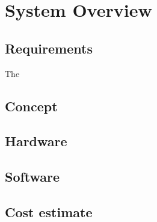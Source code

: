 \documentclass[../thesis.tex]{subfiles}
\begin{document}
\chapter{System Overview}

\section{Requirements}

The 


\section{Concept}


\section{Hardware}


\section{Software}


\section{Cost estimate}
\end{document}
